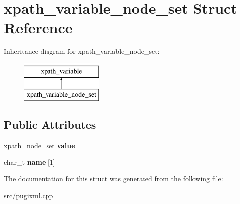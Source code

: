 \hypertarget{structxpath__variable__node__set}{}\section{xpath\+\_\+variable\+\_\+node\+\_\+set Struct Reference}
\label{structxpath__variable__node__set}
Inheritance diagram for xpath\+\_\+variable\+\_\+node\+\_\+set\+:\begin{figure}[H]
\begin{center}
\leavevmode
\includegraphics[height=2.000000cm]{structxpath__variable__node__set}
\end{center}
\end{figure}
\subsection*{Public Attributes}
\begin{DoxyCompactItemize}
\item 
\mbox{\label{structxpath__variable__node__set_a830ac0dbcaf5f8ff3373d10273e72bf4}} 
xpath\+\_\+node\+\_\+set {\bfseries value}
\item 
\mbox{\label{structxpath__variable__node__set_a9a6a40cea40764364adb3ddba2e7a2ff}} 
char\+\_\+t {\bfseries name} \mbox{[}1\mbox{]}
\end{DoxyCompactItemize}


The documentation for this struct was generated from the following file\+:\begin{DoxyCompactItemize}
\item 
src/pugixml.\+cpp\end{DoxyCompactItemize}
